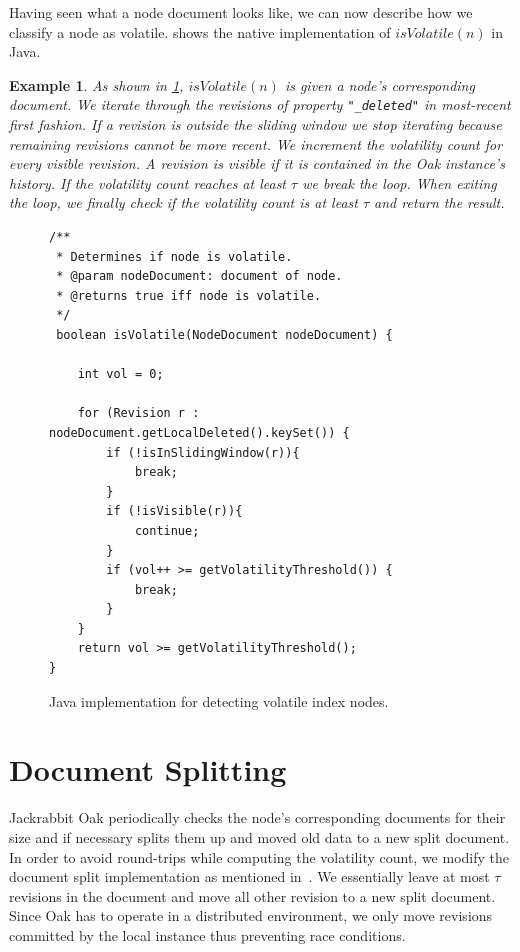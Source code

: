 \documentclass[abstracton,12pt]{scrreprt}
\newtheorem{example}{Example}
\begin{document}
Having seen what a node document looks like, we can now describe how we classify a node as volatile.
 shows the native implementation of $isVolatile(n)$ in Java.
\begin{example}
    As shown in \cref{fig:is_volatile}, $isVolatile(n)$ is given a node's corresponding document.
    We iterate through the revisions of property \texttt{"\_deleted"} in most-recent first fashion.
    If a revision is outside the sliding window we stop iterating because remaining revisions cannot be more recent.
    We increment the volatility count for every visible revision.
    A revision is visible if it is contained in the Oak instance's history.
    If the volatility count reaches at least $\tau$ we break the loop.
    When exiting the loop, we finally check if the volatility count is at least $\tau$ and return the result.
\end{example}

\begin{figure}[h]
    \begin{framed}
        \begin{scriptsize}
            \begin{verbatim}
/**
 * Determines if node is volatile.
 * @param nodeDocument: document of node.
 * @returns true iff node is volatile.
 */            
 boolean isVolatile(NodeDocument nodeDocument) {

    int vol = 0;
    
    for (Revision r : nodeDocument.getLocalDeleted().keySet()) {
        if (!isInSlidingWindow(r)){
            break;
        }
        if (!isVisible(r)){
            continue;
        }
        if (vol++ >= getVolatilityThreshold()) {
            break;
        }
    }
    return vol >= getVolatilityThreshold();
}
            \end{verbatim}
        \end{scriptsize}
    \end{framed}
    \caption{Java implementation for detecting volatile index nodes.}
    \label{fig:is_volatile}
\end{figure}

\section{Document Splitting}

Jackrabbit Oak periodically checks the node's corresponding documents for their size and if necessary splits them up and moved old data to a new split document.
In order to avoid round-trips while computing the volatility count, we modify the document split implementation as mentioned in~\cite{KW17}.
We essentially leave at most $\tau$ revisions in the document and move all other revision to a new split document.
Since Oak has to operate in a distributed environment, we only move revisions committed by the local instance thus preventing race conditions.
\end{document}
